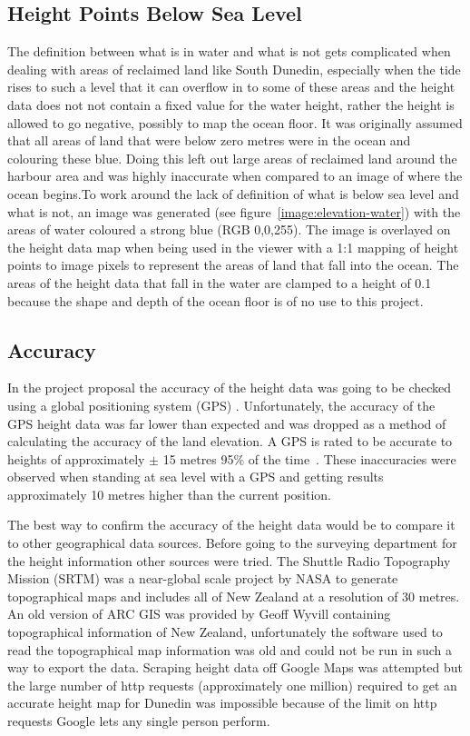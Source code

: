 \documentclass[12pt]{report}
\begin{document}
\subsection{Height Points Below Sea Level}
The definition between what is in water and what is not gets complicated when dealing with areas of reclaimed land like South Dunedin, especially when the tide rises to such a level that it can overflow in to some of these areas and the height data does not not contain a fixed value for the water height, rather the height is allowed to go negative, possibly to map the ocean floor. It was originally assumed that all areas of land that were below zero metres were in the ocean and colouring these blue. Doing this left out large areas of reclaimed land around the harbour area and was highly inaccurate when compared to an image of where the ocean begins.To work around the lack of definition of what is below sea level and what is not, an image was generated (see figure~\ref{image:elevation-water}) with the areas of water coloured a strong blue (RGB 0,0,255). The image is overlayed on the height data map when being used in the viewer with a 1:1 mapping of height points to image pixels to represent the areas of land that fall into the ocean. The areas of the height data that fall in the water are clamped to a height of 0.1 because the shape and depth of the ocean floor is of no use to this project.

\subsection{Accuracy}
In the project proposal the accuracy of the height data was going to be checked using a global positioning system (GPS) . Unfortunately, the accuracy of the GPS height data was far lower than expected and was dropped as a method of calculating the accuracy of the land elevation. A GPS is rated to be accurate to heights of approximately $\pm$ 15 metres 95\% of the time~\cite{gpsaltitude}. These inaccuracies were observed when standing at sea level with a GPS and getting results approximately 10 metres higher than the current position.

The best way to confirm the accuracy of the height data would be to compare it to other geographical data sources. Before going to the surveying department for the height information other sources were tried. The Shuttle Radio Topography Mission (SRTM)\cite{srtm} was a near-global scale project by NASA to generate topographical maps and includes all of New Zealand at a resolution of 30 metres. An old version of ARC GIS was provided by Geoff Wyvill containing topographical information of New Zealand, unfortunately the software used to read the topographical map information was old and could not be run in such a way to export the data. Scraping height data off Google Maps\cite{gmaps} was attempted but the large number of http requests (approximately one million) required to get an accurate height map for Dunedin was impossible because of the limit on http requests Google lets any single person perform.
\end{document}
